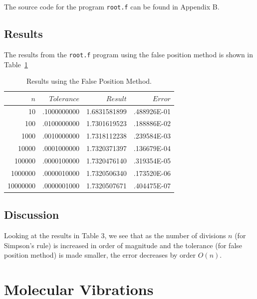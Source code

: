 \documentclass[a4paper]{IEEEtran}
\begin{document}
    The source code for the program \verb+root.f+ can be found in
    Appendix B.

\subsection{Results}
    The results from the \verb+root.f+ program using the false position
    method is shown in Table~\ref{tbl:false-position}

    \begin{table}[h]
    \caption{Results using the False Position Method.}
    \label{tbl:false-position} 
    \begin{center}
    \begin{tabular}{|r|r|r|r|} \hline
         $n$  & $Tolerance$ & $Result$  & $Error$ \\
    \hline 
    \hline
         10   &.1000000000  &1.6831581899   &.488926E-01 \\
        100   &.0100000000  &1.7301619523   &.188886E-02 \\
       1000   &.0010000000  &1.7318112238   &.239584E-03 \\
      10000   &.0001000000  &1.7320371397   &.136679E-04 \\
     100000   &.0000100000  &1.7320476140   &.319354E-05 \\
    1000000   &.0000010000  &1.7320506340   &.173520E-06 \\ 
   10000000   &.0000001000  &1.7320507671   &.404475E-07 \\ \hline
    \end{tabular}
    \end{center}
    \end{table} 

\subsection{Discussion}
    Looking at the results in Table 3, we see that as the number of
    divisions $n$ (for Simpson's rule) is increased in order of magnitude 
    and the tolerance (for false position method) is made smaller, the
    error decreases by order $O(n)$.


\section{Molecular Vibrations}
\end{document}
